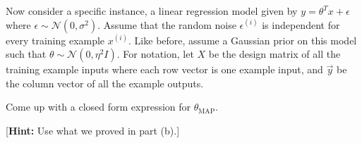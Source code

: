 \item {}
Now consider a specific instance, a linear regression model given by
$y=\theta^T x + \epsilon$ where $\epsilon \sim \mathcal{N}(0,\sigma^2)$. Assume
that the random noise $\epsilon^{(i)}$ is independent for every training example
$x^{(i)}$. Like before, assume a Gaussian prior on this model such that
$\theta \sim \mathcal{N}(0,\eta^2 I)$. For notation, let $X$ be the design
matrix of all the training example inputs where each row vector is one example
input, and $\vec{y}$ be the column vector of all the example outputs.

Come up with a closed form expression for $\theta_\text{MAP}$.

[\textbf{Hint:} Use what we proved in part (b).]

